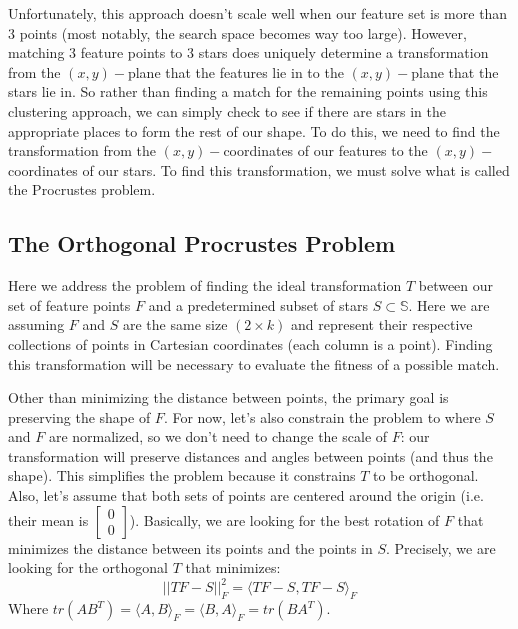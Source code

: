 \documentclass[paper=a4, fontsize=11pt]{scrartcl} %
\begin{document}
Unfortunately, this approach doesn't scale well when our feature set is more than 3 points (most notably, the search space becomes way too large). However, matching 3 feature points to 3 stars does uniquely determine a transformation from the $(x,y)-$plane that the features lie in to the $(x,y)-$plane that the stars lie in. So rather than finding a match for the remaining points using this clustering approach, we can simply check to see if there are stars in the appropriate places to form the rest of our shape. To do this, we need to find the transformation from the $(x,y)-$coordinates of our features to the $(x,y)-$coordinates of our stars. To find this transformation, we must solve what is called the Procrustes problem.

\subsection{The Orthogonal Procrustes Problem\cite{Everson1997}}
Here we address the problem of finding the ideal transformation $T$ between our set of feature points $F$ and a predetermined subset of stars $S\subset \mathbb{S}$. Here we are assuming $F$ and $S$ are the same size $(2\times k)$ and represent their respective collections of points in Cartesian coordinates (each column is a point).  Finding this transformation will be necessary to evaluate the fitness of a possible match.

Other than minimizing the distance between points, the primary goal is preserving the shape of $F$. For now, let's also constrain the problem to where $S$ and $F$ are normalized, so we don't need to change the scale of $F$: our transformation will preserve distances and angles between points (and thus the shape). This simplifies the problem because it constrains $T$ to be orthogonal. Also, let's assume that both sets of points are centered around the origin (i.e. their mean is $\begin{bmatrix}
0\\
0
\end{bmatrix}$). Basically, we are looking for the best rotation of $F$ that minimizes the distance between its points and the points in $S$. Precisely, we are looking for the orthogonal $T$ that minimizes: 
$$||TF-S||^2_F = \langle TF-S, TF-S\rangle_F$$
Where $tr(AB^T) = \langle A,B\rangle_F = \langle B,A\rangle_F = tr(BA^T)$.

\end{document}
